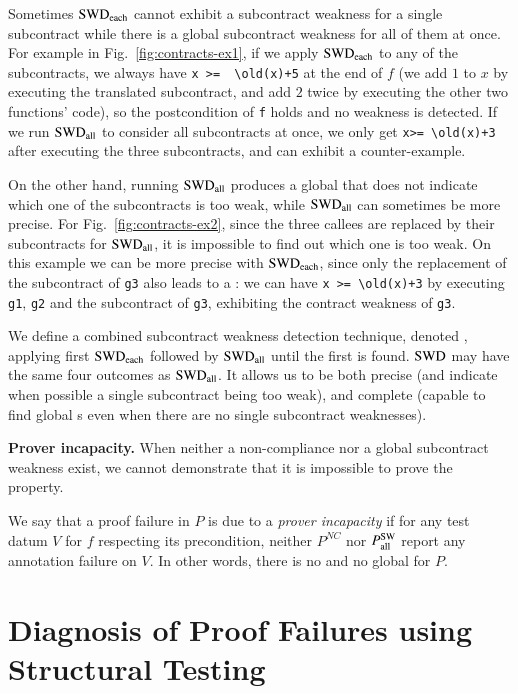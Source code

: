 Sometimes $\mathrm{SWD}_\mathrm{each}$ cannot exhibit a subcontract weakness for a single subcontract
while there is a global subcontract weakness for all of them at once.
For example in Fig.~\ref{fig:contracts-ex1},
if we apply $\mathrm{SWD}_\mathrm{each}$ to any of the subcontracts, we always have
\lstinline'x >=  \old(x)+5' at the end of $f$
(we add $1$ to $x$ by executing the translated subcontract,
and add $2$ twice by executing the other two functions' code),
so the postcondition of \lstinline'f' holds and no weakness is detected.
If we run  $\mathrm{SWD}_\mathrm{all}$  to consider all subcontracts at once, we only get
\lstinline'x>= \old(x)+3' after executing the three subcontracts, and can exhibit a counter-example.

On the other hand, running  $\mathrm{SWD}_\mathrm{all}$
produces a global \CWCE that does not indicate which one of the subcontracts is too weak,
while $\mathrm{SWD}_\mathrm{all}$ can sometimes be more precise.
For Fig.~\ref{fig:contracts-ex2},
since the three callees are replaced by their subcontracts for  $\mathrm{SWD}_\mathrm{all}$,  it is impossible
to find out which one is too weak.
On this example we can be more precise with $\mathrm{SWD}_\mathrm{each}$,
since only the replacement of the  subcontract of  \lstinline'g3' also leads to a \CWCE:
we can have \lstinline'x >= \old(x)+3' by executing
\lstinline'g1',  \lstinline'g2' and the subcontract of \lstinline'g3',
exhibiting the contract weakness of \lstinline'g3'.

We define a combined subcontract weakness detection technique, denoted \CWD, applying
first $\mathrm{SWD}_{\mathrm{each}}$ followed by  $\mathrm{SWD}_{\mathrm{all}}$ until the first \CWCE is found. 
$\mathrm{SWD}$ may have the same four outcomes as  $\mathrm{SWD}_{\mathrm{all}}$.
It allows us
to be both precise (and indicate when possible a single subcontract being too weak),
and complete (capable to find global \CWCE{}s even when there are no single subcontract weaknesses).

\textbf{Prover incapacity.}
When neither a non-compliance nor a global subcontract weakness
exist, we cannot demonstrate that it is impossible to prove the property.

\begin{definition} 
\label{def:prov-incap}
We say that a proof failure in $P$ is due to a \emph{prover incapacity} 
if for any test datum $V$ for $f$ respecting its precondition,
neither $P^{NC}$ nor $P_{\mathrm{all}}^{\mathrm{SW}}$ report any annotation failure on $V$.
In other words, there is no \NCCE and no global \CWCE for $P$.
\end{definition}


\section{Diagnosis of Proof Failures using Structural Testing}
\label{sec:global-method}


